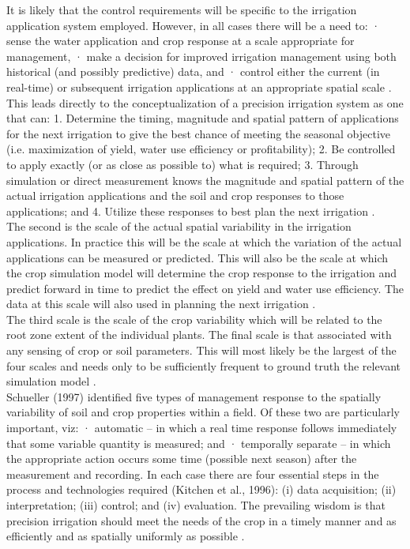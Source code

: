 \documentclass[letterpaper, 10 pt, conference]{ieeeconf}  %
\begin{document}
It is likely that the control requirements will be specific to the irrigation application system employed. However, in all cases there will be a need to: · sense the water application and crop response at a scale appropriate for management, · make a decision for improved irrigation management using both historical (and possibly predictive) data, and · control either the current (in real-time) or subsequent irrigation applications at an appropriate spatial scale \cite{Smith2011}.\\

This leads directly to the conceptualization of a precision irrigation system as one that can: 1. Determine the timing, magnitude and spatial pattern of applications for the next irrigation to give the best chance of meeting the seasonal objective (i.e. maximization of yield, water use efficiency or profitability); 2. Be controlled to apply exactly (or as close as possible to) what is required; 3. Through simulation or direct measurement knows the magnitude and spatial pattern of the actual irrigation applications and the soil and crop responses to those applications; and 4. Utilize these responses to best plan the next irrigation \cite{Smith2011}.\\

The second is the scale of the actual spatial variability in the irrigation applications. In practice this will be the scale at which the variation of the actual applications can be measured or predicted. This will also be the scale at which the crop simulation model will determine the crop response to the irrigation and predict forward in time to predict the effect on yield and water use efficiency. The data at this scale will also used in planning the next irrigation \cite{Smith2011}.\\

The third scale is the scale of the crop variability which will be related to the root zone extent of the individual plants. The final scale is that associated with any sensing of crop or soil parameters. This will most likely be the largest of the four scales and needs only to be sufficiently frequent to ground truth the relevant simulation model \cite{Smith2011}.\\

Schueller (1997) identified five types of management response to the spatially variability of soil and crop properties within a field. Of these two are particularly important, viz: · automatic – in which a real time response follows immediately that some variable quantity is measured; and · temporally separate – in which the appropriate action occurs some time (possible next season) after the measurement and recording. In each case there are four essential steps in the process and technologies required (Kitchen et al., 1996): (i) data acquisition; (ii) interpretation; (iii) control; and (iv) evaluation.
The prevailing wisdom is that precision irrigation should meet the needs of the crop in a timely manner and as efficiently and as spatially uniformly as possible \cite{Smith2011}.\\
\end{document}
